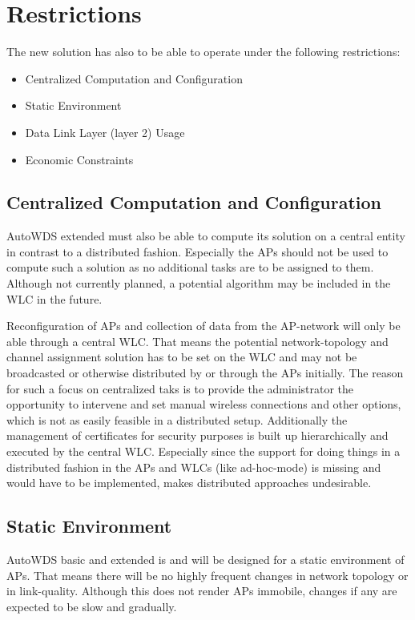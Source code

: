   \section{Restrictions}
    The new solution has also to be able to operate under the following restrictions:
    \begin{itemize}
     \item Centralized Computation and Configuration
     \item Static Environment
     \item Data Link Layer (layer 2) Usage
     \item Economic Constraints
    \end{itemize}
    
    \subsection{Centralized Computation and Configuration}
      AutoWDS extended must also be able to compute its solution on a central entity in contrast to a distributed fashion.
      Especially the APs should not be used to compute such a solution as no additional tasks are to be assigned to them.
      Although not currently planned, a potential algorithm may be included in the \ac{WLC} in the future.
      
      Reconfiguration of APs and collection of data from the \ac{AP}-network will only be able through a central \ac{WLC}.
      That means the potential network-topology and channel assignment solution has to be set on the \ac{WLC} and may not be broadcasted or otherwise
      distributed by or through the APs initially. The reason for such a focus on centralized taks is to provide the administrator the 
      opportunity to intervene and set manual wireless connections and other options, which is not as easily feasible in a distributed setup. 
      Additionally the management of certificates for security purposes is built up hierarchically and executed by the central \ac{WLC}.
      Especially since the support for doing things in a distributed fashion in the APs and WLCs (like ad-hoc-mode) is missing and would have to be implemented, 
      makes distributed approaches undesirable.
      
    \subsection{Static Environment}
      AutoWDS basic and extended is and will be designed for a static environment of APs. That means there will be no highly frequent changes in
      network topology or in link-quality. Although this does not render APs immobile, changes if any are expected to be slow and gradually.
      
